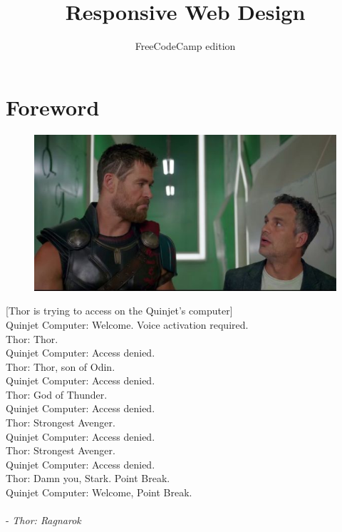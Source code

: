 \documentclass{42-en}
\begin{document}
                           \title{Responsive Web Design}
                          \subtitle{FreeCodeCamp edition}


\maketitle

\tableofcontents


\chapter{Foreword}

    \begin{figure}[H]
        \begin{center}
            \includegraphics[width=12cm]{thor.jpg}
        \end{center}
    \end{figure}
    [Thor is trying to access on the Quinjet’s computer]\\
Quinjet Computer: Welcome. Voice activation required.\\
Thor: Thor.\\
Quinjet Computer: Access denied.\\
Thor: Thor, son of Odin.\\
Quinjet Computer: Access denied.\\
Thor: God of Thunder.\\
Quinjet Computer: Access denied.\\
Thor: Strongest Avenger.\\
Quinjet Computer: Access denied.\\
Thor: Strongest Avenger.\\
Quinjet Computer: Access denied.\\
Thor: Damn you, Stark. Point Break.\\
Quinjet Computer: Welcome, Point Break.\\
\\
- \textit{Thor: Ragnarok}
    
\end{document}
